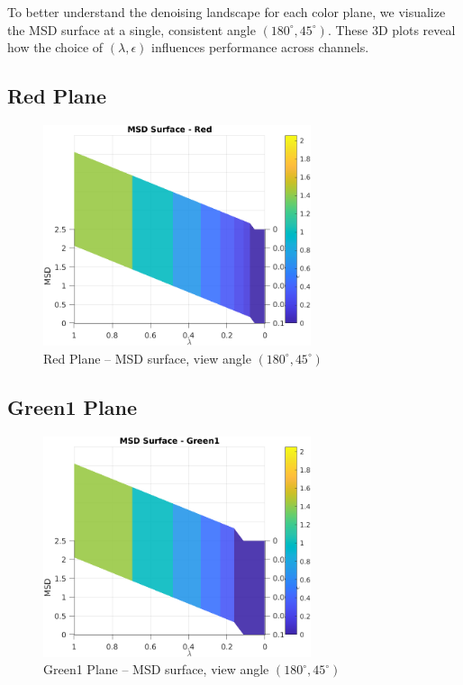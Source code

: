 \documentclass[11pt]{article}
\begin{document}
To better understand the denoising landscape for each color plane, we visualize the MSD surface at a single, consistent angle \((180^\circ,45^\circ)\).  These 3D plots reveal how the choice of \((\lambda,\epsilon)\) influences performance across channels.

\subsection*{Red Plane}
\begin{figure}[h!]
\centering
\includegraphics[width=0.7\textwidth]{../utils/results/msd_surfaces/msd_surface_red_angle_180_45.png}
\caption{Red Plane – MSD surface, view angle $(180^\circ,45^\circ)$}
\end{figure}
\clearpage

\subsection*{Green1 Plane}
\begin{figure}[h!]
\centering
\includegraphics[width=0.7\textwidth]{../utils/results/msd_surfaces/msd_surface_green1_angle_180_45.png}
\caption{Green1 Plane – MSD surface, view angle $(180^\circ,45^\circ)$}
\end{figure}
\clearpage
\end{document}
